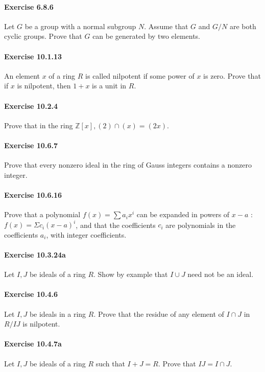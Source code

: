 \documentclass{article}
\begin{document}
\paragraph{Exercise 6.8.6} Let $G$ be a group with a normal subgroup $N$. Assume that $G$ and $G / N$ are both cyclic groups. Prove that $G$ can be generated by two elements.

\paragraph{Exercise 10.1.13} An element $x$ of a ring $R$ is called nilpotent if some power of $x$ is zero. Prove that if $x$ is nilpotent, then $1+x$ is a unit in $R$.

\paragraph{Exercise 10.2.4} Prove that in the ring $\mathbb{Z}[x],(2) \cap(x)=(2 x)$.

\paragraph{Exercise 10.6.7} Prove that every nonzero ideal in the ring of Gauss integers contains a nonzero integer.

\paragraph{Exercise 10.6.16} Prove that a polynomial $f(x)=\sum a_i x^i$ can be expanded in powers of $x-a$ : $f(x)=\Sigma c_i(x-a)^i$, and that the coefficients $c_i$ are polynomials in the coefficients $a_i$, with integer coefficients.

\paragraph{Exercise 10.3.24a} Let $I, J$ be ideals of a ring $R$. Show by example that $I \cup J$ need not be an ideal. 

\paragraph{Exercise 10.4.6} Let $I, J$ be ideals in a ring $R$. Prove that the residue of any element of $I \cap J$ in $R / I J$ is nilpotent.

\paragraph{Exercise 10.4.7a} Let $I, J$ be ideals of a ring $R$ such that $I+J=R$. Prove that $I J=I \cap J$.
\end{document}

